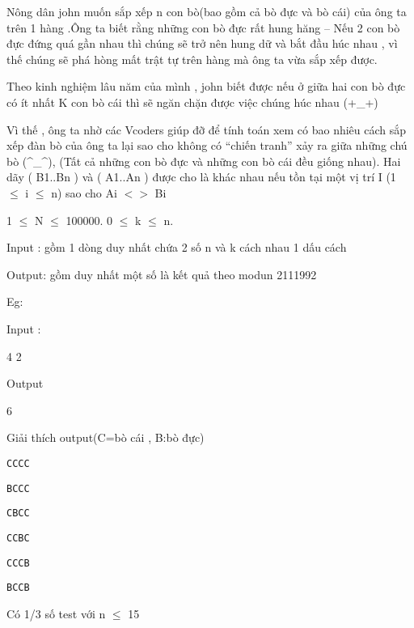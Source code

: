 



   Nông dân john muốn sắp xếp n con bò(bao gồm cả bò đực và bò cái) của ông ta trên 1 hàng .Ông ta biết rằng những con bò đực rất hung hăng – Nếu 2 con bò đực đứng quá gần nhau thì chúng sẽ trở nên hung dữ và bắt đầu húc nhau , vì thế chúng sẽ phá hòng mất trật tự trên hàng mà ông ta vừa sắp xếp được.  

   Theo kinh nghiệm lâu năm của mình , john biết được nếu ở giữa hai con bò đực có ít nhất K con bò cái thì sẽ ngăn chặn được việc chúng húc nhau (+\_+)  

   Vì thế , ông ta nhờ các Vcoders giúp đỡ để tính toán xem có bao nhiêu cách sắp xếp đàn bò của ông ta lại sao cho không có “chiến tranh” xảy ra giữa những chú bò (^\_^), (Tất cả những con bò đực và những con bò cái đều giống nhau). Hai dãy (       B1..Bn       ) và (       A1..An       ) được cho là khác nhau nếu tồn tại một vị trí I (1 $\le$ i $\le$ n) sao cho       Ai $<$$>$ Bi    




   1 $\le$ N $\le$ 100000. 0 $\le$ k $\le$ n.  

   Input : gồm 1 dòng duy nhất chứa 2 số n và k cách nhau 1 dấu cách  

   Output: gồm duy nhất một số là kết quả theo modun 2111992  



   Eg:  

   Input :  



   4 2  



   Output  



   6  



   Giải thích output(C=bò cái , B:bò đực)  
\begin{verbatim}
CCCC\end{verbatim}
\begin{verbatim}
BCCC\end{verbatim}
\begin{verbatim}
CBCC\end{verbatim}
\begin{verbatim}
CCBC\end{verbatim}
\begin{verbatim}
CCCB\end{verbatim}
\begin{verbatim}
BCCB\end{verbatim}

Có 1/3 số test với n $\le$ 15
